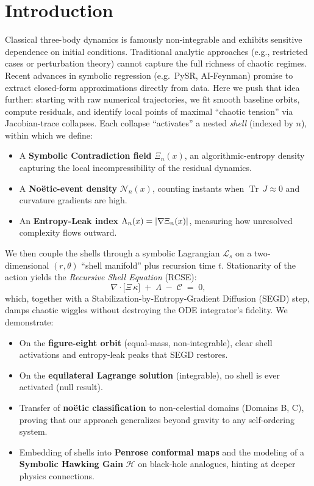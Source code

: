 \documentclass[11pt]{article}
\newcommand{\Contradiction}{\Xi}
\newcommand{\Coherence}{\mathcal{C}}
\newcommand{\Noetic}{\mathcal{N}}
\newcommand{\Leak}{\Lambda}
\newcommand{\Curv}{\kappa}
\newcommand{\Lag}{\mathcal{L}_s}
\newcommand{\Hgain}{\mathcal{H}}
\newcommand{\TrJ}{\operatorname{Tr}\,J}
\let\CustomAbs\abs
\begin{document}
\section{Introduction}
Classical three-body dynamics is famously non-integrable and exhibits sensitive dependence on initial conditions. Traditional analytic approaches (e.g., restricted cases or perturbation theory) cannot capture the full richness of chaotic regimes. Recent advances in symbolic regression (e.g.\ PySR, AI-Feynman) promise to extract closed-form approximations directly from data. Here we push that idea further: starting with raw numerical trajectories, we fit smooth baseline orbits, compute residuals, and identify local points of maximal “chaotic tension” via Jacobian-trace collapses. Each collapse “activates” a nested \emph{shell} (indexed by \(n\)), within which we define:
\begin{itemize}[itemsep=1pt]
  \item A \textbf{Symbolic Contradiction field} \(\Contradiction_n(x)\), an algorithmic-entropy density capturing the local incompressibility of the residual dynamics.
  \item A \textbf{Noëtic-event density} \(\Noetic_n(x)\), counting instants when \(\TrJ \approx 0\) and curvature gradients are high.
  \item An \textbf{Entropy-Leak index} \(\Leak_n(x) = \CustomAbs{\nabla \Contradiction_n(x)}\), measuring how unresolved complexity flows outward.
\end{itemize}
We then couple the shells through a symbolic Lagrangian \(\Lag\) on a two‐dimensional \((r,\theta)\) “shell manifold” plus recursion time \(t\). Stationarity of the action yields the \emph{Recursive Shell Equation} (RCSE):
\[
  \nabla \cdot \bigl[\Contradiction\,\Curv\bigr] \;+\;\Leak \;-\;\Coherence \;=\; 0,
\]
which, together with a Stabilization-by‐Entropy‐Gradient Diffusion (SEGD) step, damps chaotic wiggles without destroying the ODE integrator’s fidelity. We demonstrate:
\begin{itemize}[itemsep=1pt]
  \item On the \textbf{figure-eight orbit} (equal‐mass, non‐integrable), clear shell activations and entropy‐leak peaks that SEGD restores.
  \item On the \textbf{equilateral Lagrange solution} (integrable), no shell is ever activated (null result).
  \item Transfer of \textbf{noëtic classification} to non‐celestial domains (Domains B, C), proving that our approach generalizes beyond gravity to any self‐ordering system.
  \item Embedding of shells into \textbf{Penrose conformal maps} and the modeling of a \textbf{Symbolic Hawking Gain} \(\Hgain\) on black‐hole analogues, hinting at deeper physics connections.
\end{itemize}
\end{document}
